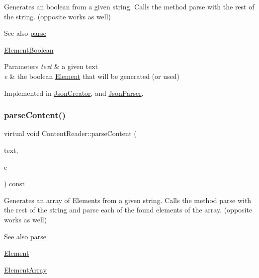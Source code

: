 Generates an boolean from a given string. Calls the method parse with the rest of the string. (opposite works as well) \begin{DoxySeeAlso}{See also}
\mbox{\hyperlink{classContentReader_a7fff2e63a2e8fa216665604f69974e1d}{parse}} 

\mbox{\hyperlink{classElementBoolean}{Element\+Boolean}}
\end{DoxySeeAlso}

\begin{DoxyParams}{Parameters}
{\em text} & a given text \\
\hline
{\em e} & the boolean \mbox{\hyperlink{classElement}{Element}} that will be generated (or used) \\
\hline
\end{DoxyParams}


Implemented in \mbox{\hyperlink{classJsonCreator_a95fb65046a7467b8e48feaf92a62b40c}{Json\+Creator}}, and \mbox{\hyperlink{classJsonParser_a0857f5d286e5f0b973e2791e5e7a4e83}{Json\+Parser}}.

\mbox{\label{classContentReader_a91fdd738983dcc7a246c3c163007dfa9}} 
\subsubsection{\texorpdfstring{parse\+Content()}{parseContent()}\hspace{0.1cm}{\footnotesize\ttfamily [4/6]}}
{\footnotesize\ttfamily virtual void Content\+Reader\+::parse\+Content (\begin{DoxyParamCaption}\item[{std\+::string \&}]{text,  }\item[{\mbox{\hyperlink{classElementArray}{Element\+Array}} $\ast$}]{e }\end{DoxyParamCaption}) const\hspace{0.3cm}{\ttfamily [pure virtual]}}

Generates an array of Elements from a given string. Calls the method parse with the rest of the string and parse each of the found elements of the array. (opposite works as well) \begin{DoxySeeAlso}{See also}
\mbox{\hyperlink{classContentReader_a7fff2e63a2e8fa216665604f69974e1d}{parse}} 

\mbox{\hyperlink{classElement}{Element}} 

\mbox{\hyperlink{classElementArray}{Element\+Array}}
\end{DoxySeeAlso}

